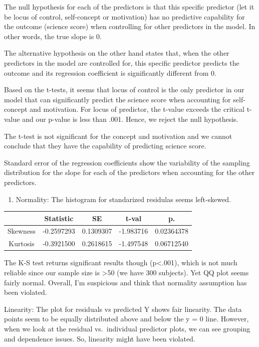 \documentclass[]{article}
\providecommand{\tightlist}{%
  \setlength{\itemsep}{0pt}\setlength{\parskip}{0pt}}
\begin{document}
The null hypothesis for each of the predictors is that this specific
predictor (let it be locus of control, self-concept or motivation) has
no predictive capability for the outcome (science score) when
controlling for other predictors in the model. In other words, the true
slope is 0.

The alternative hypothesis on the other hand states that, when the other
predictors in the model are controlled for, this specific predictor
predicts the outcome and its regression coefficient is significantly
different from 0.

Based on the t-tests, it seems that locus of control is the only
predictor in our model that can significantly predict the science score
when accounting for self-concept and motivation. For locus of predictor,
the t-value exceeds the critical t-value and our p-value is less than
.001. Hence, we reject the null hypothesis.

The t-test is not significant for the concept and motivation and we
cannot conclude that they have the capability of predicting science
score.

Standard error of the regression coefficients show the variability of
the sampling distribution for the slope for each of the predictors when
accounting for the other predictors.

\begin{enumerate}
\def\labelenumi{\arabic{enumi}.}
\setcounter{enumi}{3}
\tightlist
\item
  Normality: The histogram for standarized residulas seems left-skewed.
\end{enumerate}

\begin{table}[H]
\centering
\begin{tabular}{c|c|c|c|c}
& Statistic & SE & t-val & p. \\\hline
Skewness & -0.2597293 & 0.1309307 & -1.983716 & 0.02364378\\
Kurtosis & -0.3921500 & 0.2618615 & -1.497548 & 0.06712540
\end{tabular}
\end{table}

The K-S test returns significant results though (p\textless{}.001),
which is not much reliable since our sample size is \textgreater{}50 (we
have 300 subjects). Yet QQ plot seems fairly normal. Overall, I'm
suspicious and think that normality assumption has been violated.

Linearity: The plot for residuals vs predicted Y shows fair linearity.
The data points seem to be equally distributed above and below the y = 0
line. However, when we look at the residual vs.~individual predictor
plots, we can see grouping and dependence issues. So, linearity might
have been violated.
\end{document}
